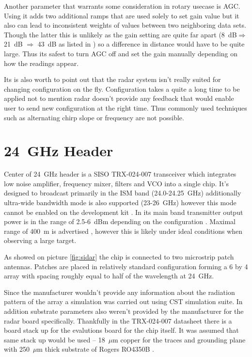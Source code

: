 Another parameter that warrants some consideration in rotary usecase is AGC.
Using it adds two additional ramps that are used solely to set gain value but it also can lead to inconsistent weights of values between two neighboring data sets.
Though the latter this is unlikely as the gain setting are quite far apart (8~dB$\Rightarrow$ 21~dB $\Rightarrow$ 43~dB as listed in \cite{sidarPRO}) so a difference in distance would have to be quite large.
Thus its safest to turn AGC off and set the gain manually depending on how the readings appear.

Its is also worth to point out that the radar system isn't really suited for changing configuration on the fly.
Configuration takes a quite a long time to be applied not to mention radar doesn't provide any feedback that would enable user to send new configuration at the right time.
Thus commonly used techniques such as alternating chirp slope or frequency are not possible.










\section{24~GHz Header}

Center of 24~GHz header is a SISO TRX-024-007 transceiver which integrates low noise amplifier, frequency mixer, filters and VCO into a single chip.
It's designed to broadcast primarily in the ISM band (24.0-24.25~GHz) additionally ultra-wide bandwidth mode is also supported (23-26~GHz) \cite{sidarTRX24} however this mode cannot be enabled on the development kit \cite{sidarPRO}.
In its main band transmitter output power is in the range of 2.5-6~dBm depending on the configuration \cite{sidarTRX24}.
Maximal range of 400~m is advertised \cite{sidarMANOld}, however this is likely under ideal conditions when observing a large target.

As showed on picture \ref{fig:sidar} the chip is connected to two microstrip patch antennas.
Patches are placed in relatively standard configuration forming a 6 by 4 array with spacing roughly equal to half of the wavelength at 24~GHz.

Since the manufacturer wouldn't provide any information about the radiation pattern of the array a simulation was carried out using CST simulation suite.
In addition substrate parameters also weren't provided by the manufacturer for the radar board specifically.
Thankfully in the TRX-024-007 datasheet there is a board stack up for the evalutions board for the chip itself.
It was assumed that same stack up would be used -- 18~$\mu$m copper for the traces and grounding plane with 250~$\mu$m thick substrate of Rogers RO4350B \cite{sidarTRX24}.

